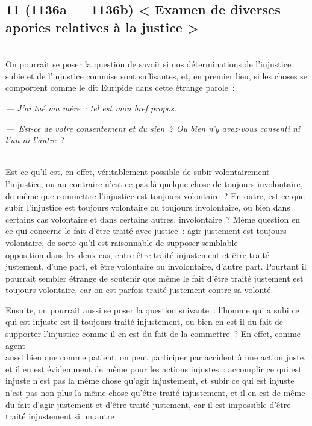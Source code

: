 \documentclass[french,twoside]{book} %
\begin{document}
\subsection[{11 (1136a — 1136b) < Examen de diverses apories relatives à la justice >}]{11 (1136a — 1136b) < Examen de diverses apories relatives à la justice >}
\noindent \\
On pourrait se poser la question de savoir si nos déterminations de l’injustice subie et de l’injustice commise sont suffisantes, et, en premier lieu, si les choses se comportent comme le dit Euripide dans cette étrange parole :\par
 {\itshape — J’ai tué ma mère : tel est mon bref propos.} \par
{\itshape — Est-ce de votre consentement et du sien ? Ou bien n’y avez-vous consenti ni l’un ni l’autre} ? \par
\\
Est-ce qu’il est, en effet, véritablement possible de subir volontairement l’injustice, ou au contraire n’est-ce pas là quelque chose de toujours involontaire, de même que commettre l’injustice est toujours volontaire ? En outre, est-ce que subir l’injustice est toujours volontaire ou toujours involontaire, ou bien dans certains cas volontaire et dans certains autres, involontaire ? Même question en ce qui concerne le fait d’être traité avec justice : agir justement est toujours volontaire, de sorte qu’il est raisonnable de supposer semblable \\
opposition dans les deux cas, entre être traité injustement et être traité justement, d’une part, et être volontaire ou involontaire, d’autre part. Pourtant il pourrait sembler étrange de soutenir que même le fait d’être traité justement est toujours volontaire, car on est parfois traité justement contre sa volonté.\par
Ensuite, on pourrait aussi se poser la question suivante : l’homme qui a subi ce qui est injuste est-il toujours traité injustement, ou bien en est-il du fait de supporter l’injustice comme il en est du fait de la commettre ? En effet, comme agent \\
aussi bien que comme patient, on peut participer par accident à une action juste, et il en est évidemment de même pour les actions injustes : accomplir ce qui est injuste n’est pas la même chose qu’agir injustement, et subir ce qui est injuste n’est pas non plus la même chose qu’être traité injustement, et il en est de même du fait d’agir justement et d’être traité justement, car il est impossible d’être traité injustement si un autre \\
\end{document}
